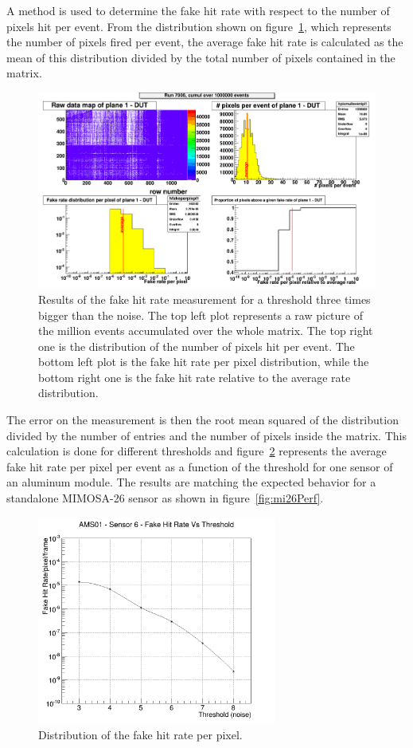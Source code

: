   A method is used to determine the fake hit rate with respect to the number of pixels hit per event.
  From the distribution shown on figure~\ref{fig:pixel/event}, which represents the number of pixels fired per event, the average fake hit rate is calculated as the mean of this distribution divided by the total number of pixels contained in the matrix.
    \begin{figure}
    \centering
    \includegraphics[width = \textwidth]{Pictures/labTests/FHR_AS01_chip3.png}
    \caption{Results of the fake hit rate measurement for a threshold three times bigger than the noise. The top left plot represents a raw picture of the million events accumulated over the whole matrix. The top right one is the distribution of the number of pixels hit per event. The bottom left plot is the fake hit rate per pixel distribution, while the bottom right one is the fake hit rate relative to the average rate distribution.}
    \label{fig:pixel/event}
  \end{figure}
  The error on the measurement is then the root mean squared of the distribution divided by the number of entries and the number of pixels inside the matrix.
  This calculation is done for different thresholds and figure~\ref{fig:FHR} represents the average fake hit rate per pixel per event as a function of the threshold for one sensor of an aluminum module.
  The results are matching the expected behavior for a standalone \gls{MIMOSA}-26 sensor as shown in figure~\ref{fig:mi26Perf}.

  \begin{figure}
    \centering
    \includegraphics[width=0.7\textwidth]{Pictures/labTests/fake_sensor6.png}
    \caption{Distribution of the fake hit rate per pixel.}
    \label{fig:FHR}
  \end{figure}

